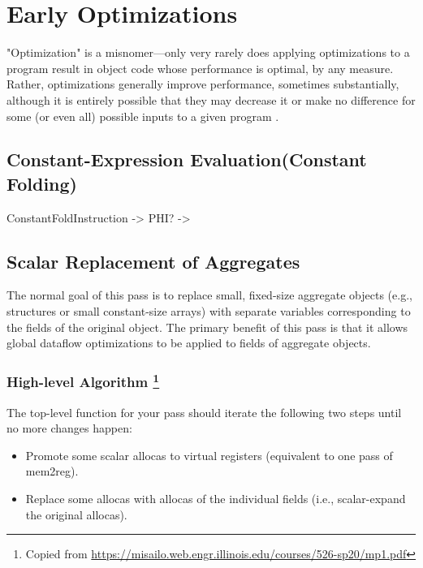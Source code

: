 \newpage 


\section{Early Optimizations}

"Optimization" is a misnomer—only very rarely
does applying optimizations to a program result in object code whose performance
is optimal, by any measure. Rather, optimizations generally improve performance,
sometimes substantially, although it is entirely possible that they may decrease it or
make no difference for some (or even all) possible inputs to a given program .



\subsection{Constant-Expression Evaluation(Constant Folding)}




ConstantFoldInstruction -> PHI?
                        -> 





\subsection{Scalar Replacement of Aggregates}


The normal goal of this pass is to replace small, fixed-size aggregate objects (e.g., structures or small
constant-size arrays) with separate variables corresponding to the fields of the original object. The primary benefit
of this pass is that it allows global dataflow optimizations to be applied to fields of aggregate objects.



\subsubsection{High-level Algorithm \footnote{Copied from \url{https://misailo.web.engr.illinois.edu/courses/526-sp20/mp1.pdf}}}



The top-level function for your pass should iterate the following two steps until no more changes happen:

\begin{itemize}

    \item Promote some scalar allocas to virtual registers (equivalent to one pass of mem2reg).
    \item Replace some allocas with allocas of the individual fields (i.e., scalar-expand the original allocas).
    
    
\end{itemize}    


